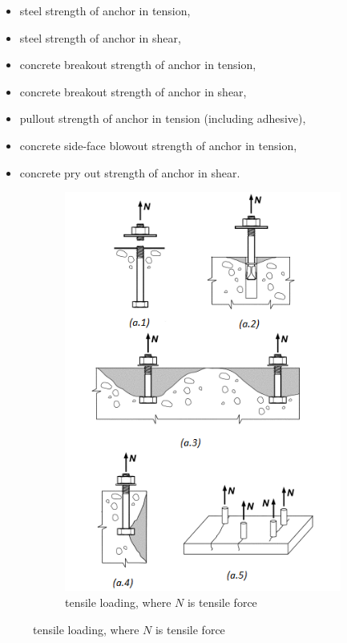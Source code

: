 \begin{itemize}
	\item steel strength of anchor in tension,
	\item steel strength of anchor in shear, 
	\item concrete breakout strength of anchor in tension,
	\item concrete breakout strength of anchor in shear,
	\item pullout strength of anchor in tension (including adhesive), 
	\item concrete side-face blowout strength of anchor in tension,
	\item concrete pry out strength of anchor in shear.
\end{itemize} 

\begin{figure}
	\centering
	\begin{subfigure}{.5\textwidth}
		\centering
		\includegraphics[width=.9\linewidth]{obrazky/failure_models_tensile.png}
		\caption{tensile loading, where $N$ is tensile force}

\end{subfigure}
\end{figure}

